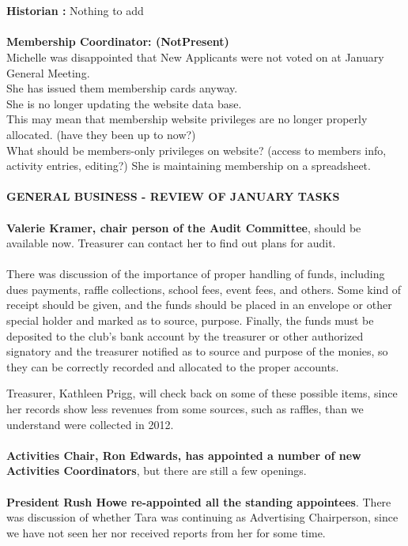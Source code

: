 \documentclass[10pt,a4paper]{article}
\begin{document}
\begin{multicols}{2}
   \\
   \\
\textbf{Historian :}
   Nothing to add
   \\
   \\
\textbf{Membership Coordinator: (NotPresent)} \\
   Michelle was disappointed that New Applicants were not voted on at January General Meeting. \\
   She has issued them membership cards anyway. \\
   She is no longer updating the website data base. \\  
      This may mean that membership website privileges are no longer properly allocated.
      (have they been up to now?)\\
      What should be members-only privileges on website? (access to members info, activity entries, editing?)
  She is maintaining membership on a spreadsheet.
  \\
  \\

\textbf{GENERAL BUSINESS - REVIEW OF JANUARY TASKS}
\\
\\
\textbf{Valerie Kramer, chair person of the Audit Committee}, should be available now. Treasurer can contact her to find out plans for audit.
\\
\\
    There was discussion of the importance of proper handling of funds, including dues payments, raffle collections, school fees, event fees, and others.  Some kind of receipt should be given, and the funds should be placed in an envelope or other special holder and marked as to source, purpose.  Finally, the funds must be deposited to the club's bank account by the treasurer or other authorized signatory and the treasurer notified  as to source and purpose of the monies, so they can be correctly recorded and allocated to the proper accounts.
    
Treasurer, Kathleen Prigg, will check back on some of these possible items, since her records show less revenues from some sources, such as raffles, than we understand were collected in 2012.
\\
\\
\textbf{Activities Chair, Ron Edwards, has appointed a number of new Activities Coordinators}, but there are still a  few openings.
\\
\\
\textbf{President Rush Howe re-appointed all the standing appointees}.  There was discussion of whether Tara was continuing as Advertising Chairperson, since we have not seen her nor received reports from her for some time.


\end{multicols}
\end{document}
